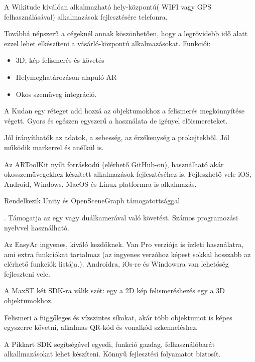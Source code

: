 
A Wikitude kíválóan alkalmazható hely-központú( WIFI vagy GPS felhasználásával) alkalmazások fejlesztésére telefonra. 

Továbbá népszerű a cégeknél annak köszönhetően, hogy a legrövidebb idő alatt ezzel lehet elkészíteni a vásárló-központú alkalmazásokat. Funkciói:
\begin{itemize}
\item 3D, kép felismerés és követés 
\item Helymeghatározáson alapuló AR
\item Okos szemüveg integráció.
\end{itemize}


A Kudan egy réteget add hozzá az objektumokhoz a felismerés megkönnyítése végett. Gyors és egészen egyszerű a használata de igényel előismereteket. 

Jól írányíthatók az adatok, a sebesség, az érzékenység a prokejtekből.
 Jól működik markerrel és anélkül is.


Az ARToolKit nyílt forráskodú (elérhető GitHub-on), használható akár okosszemüvegekhez készített alkalmazások fejlesztéséhez is. Fejleszhető vele iOS, Android, Windows, MacOS és Linux platformra is alkalmazás. 

Rendelkezik Unity és OpenSceneGraph támogatottsággal

. Támogatja az egy vagy duálkamerával való követést. Számos programozási nyelvvel használható.


Az EasyAr ingyenes, kiváló kezdőknek. Van Pro verziója is üzleti használatra, ami extra funkciókat tartalmaz (az ingyenes verzóhoz képest sokkal hosszabb az elérhető funkciók listája.). Androidra, iOs-re és Windowsra van lehetőség fejleszteni vele.


A MaxST két SDK-ra válik szét: egy a 2D kép felismeréshezés egy a 3D objektumokhoz.

 Felismeri a függőleges és vízszintes síkokat, akár több objektumot is képes egyszerre követni, alkalmas QR-kód és vonalkód szkenneléshez.


A Pikkart SDK segítségével egyedi, funkció gazdag, felhasználóbarát alkallmazásokat lehet készíteni. Könnyű fejlesztési folyamatot biztosít.

